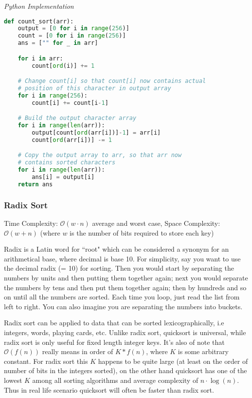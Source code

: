 \documentclass{article}
\newcommand{\bigO}{\ensuremath{\mathcal{O}}}
\begin{document}
\vspace{8pt} \emph{Python Implementation}
\begin{lstlisting}[language=Python]
def count_sort(arr):
    output = [0 for i in range(256)]
    count = [0 for i in range(256)]
    ans = ["" for _ in arr]

    for i in arr:
        count[ord(i)] += 1

    # Change count[i] so that count[i] now contains actual
    # position of this character in output array
    for i in range(256):
        count[i] += count[i-1]

    # Build the output character array
    for i in range(len(arr)):
        output[count[ord(arr[i])]-1] = arr[i]
        count[ord(arr[i])] -= 1

    # Copy the output array to arr, so that arr now
    # contains sorted characters
    for i in range(len(arr)):
        ans[i] = output[i]
    return ans
\end{lstlisting}

    \subsubsection{Radix Sort}
    Time Complexity: $\bigO(w \cdot n)$ average and worst case, Space Complexity: $\bigO(w + n)$ (where $w$ is the number of bits required to store each key)
    
    Radix is a Latin word for ``root" which can be considered a synonym for an arithmetical base, where decimal is base 10. For simplicity, say you want to use the decimal radix (= 10) for sorting. Then you would start by separating the numbers by units and then putting them together again; next you would separate the numbers by tens and then put them together again; then by hundreds and so on until all the numbers are sorted. Each time you loop, just read the list from left to right. You can also imagine you are separating the numbers into buckets. 
    
    Radix sort can be applied to data that can be sorted lexicographically, i.e integers, words, playing cards, etc. Unlike radix sort, quicksort is universal, while radix sort is only useful for fixed length integer keys. It's also of note that $\bigO(f(n))$ really means in order of $K*f(n)$, where $K$ is some arbitrary constant. For radix sort this $K$ happens to be quite large (at least on the order of number of bits in the integers sorted), on the other hand quicksort has one of the lowest $K$ among all sorting algorithms and average complexity of $n \cdot \log(n)$. Thus in real life scenario quicksort will often be faster than radix sort.
    
\end{document}
